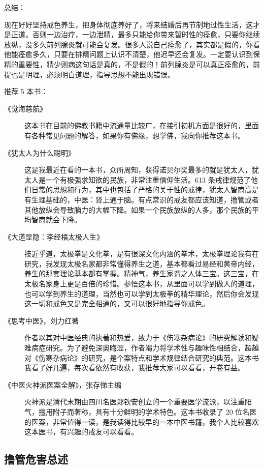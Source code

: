 \documentclass[fontset=founder]{ctexart}
\begin{document}
总结：

现在好好坚持戒色养生，把身体彻底养好了，将来结婚后再节制地过性生活，这才是正道。否则一边治疗，一边泄精，最多只能给你带来暂时性的痊愈，只要你继续放纵，没多久前列腺炎就可能会复发。很多人说自己痊愈了，其实都是假的，你看他能痊愈多久，只要在排精问题上认识不清楚，他迟早还会复发。一定要认识到保精的重要性，精少则病这句话是真的，不是假的！前列腺炎是可以真正痊愈的，前提也是明理，必须明白道理，指导思想不能出现错误。

推荐 5 本书：

\begin{description}
    \item[《觉海慈航》] 这本书在目前的佛教书籍中流通量比较广，在接引初机方面是很好的，里面有各种常见问题的解答，如果你有佛缘，想学佛，我向你推荐这本书。
    \item[《犹太人为什么聪明》] 这是我最近在看的一本书，众所周知，获得诺贝尔奖最多的就是犹太人，犹太人是一个有极强求知欲的民族，非常注重信仰生活。613 条戒律规范了他们日常的思想和行为，其中也包括了严格的关于性的戒律，犹太人智商高是有生理基础的，中医：肾上通于脑。有点常识的戒友都应该知道，撸管或者其他放纵会导致脑力的大幅下降。如果一个民族放纵的人多，那个民族的平均智商就会下降。
    \item[《大道显隐：李经梧太极人生》] 技近乎道，太极拳是文化拳，是有很深文化内涵的拳术，太极拳理论我有在研究，我发现太极名家都非常懂得养生之道，基本都看过易经和黄帝内经，养生的那套理论基本都有掌握。精神气，养生家谓之人体三宝。这三宝，在太极名家身上更是百倍的珍惜。参悟这本书，从里面可以学到做人的道理，也可以学到养生的道理，当然也可以学到太极拳的精华理论，然后你会发现这一切和戒色又是完全相通的，又可以很好地指导你戒色。
    \item[《思考中医》，刘力红著] 作者以其对中医经典的执著和热爱，致力于《伤寒杂病论》的研究解读和疑难病症研究。为了避免深奥晦涩，作者竭力将学术性与趣味性相结合，超越对《伤寒杂病论》的研究，是个案特点和学术规律结合研究的典范。这本书我看了好几遍，每次看依然有收获，我推荐大家可以看看，开卷有益。
    \item[《中医火神派医案全解》，张存悌主编] 火神派是清代末期由四川名医郑钦安创立的一个重要医学流派，以注重阳气，擅用附子而著称，具有十分鲜明的学术特色。这本书收录了 20 位名医的医案，非常值得一读，是我读得比较早的一本中医书籍，我个人比较喜欢这本医书，有兴趣的戒友可以看看。
\end{description}

\subsection{撸管危害总述}
\end{document}
